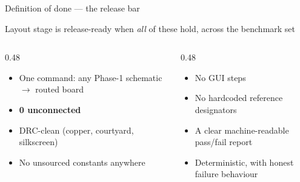 \documentclass[aspectratio=169,10pt]{beamer}
\begin{document}
\begin{frame}{Definition of done --- the release bar}
\vspace{2mm}
\begin{block}{Layout stage is release-ready when \emph{all} of these hold, across the benchmark set}
\vspace{1mm}
\begin{columns}[T]
\begin{column}{0.48\textwidth}
\begin{itemize}\small
  \item One command: any Phase-1 schematic $\rightarrow$ routed board
  \item \textbf{0 unconnected}
  \item DRC-clean (copper, courtyard, silkscreen)
  \item No unsourced constants anywhere
\end{itemize}
\end{column}
\begin{column}{0.48\textwidth}
\begin{itemize}\small
  \item No GUI steps
  \item No hardcoded reference designators
  \item A clear machine-readable pass/fail report
  \item Deterministic, with honest failure behaviour
\end{itemize}
\end{column}
\end{columns}
\end{block}
\vspace{3mm}
\begin{center}
\end{center}
\end{frame}
\end{document}

